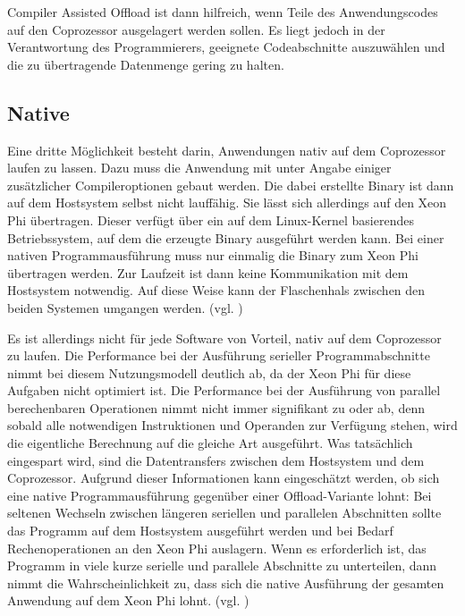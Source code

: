 \documentclass[../main.tex]{subfiles}
\begin{document}
Compiler Assisted Offload ist dann hilfreich, wenn Teile des Anwendungscodes auf den Coprozessor ausgelagert werden sollen. Es liegt jedoch in der Verantwortung des Programmierers, geeignete Codeabschnitte auszuwählen und die zu übertragende Datenmenge gering zu halten. 

\subsection{Native}
Eine dritte Möglichkeit besteht darin, Anwendungen nativ auf dem Coprozessor laufen zu lassen. Dazu muss die Anwendung mit unter Angabe einiger zusätzlicher Compileroptionen gebaut werden. Die dabei erstellte Binary ist dann auf dem Hostsystem selbst nicht lauffähig. Sie lässt sich allerdings auf den Xeon Phi übertragen. Dieser verfügt über ein auf dem Linux-Kernel basierendes Betriebssystem, auf dem die erzeugte Binary ausgeführt werden kann. Bei einer nativen Programmausführung muss nur einmalig die Binary zum Xeon Phi übertragen werden. Zur Laufzeit ist dann keine Kommunikation mit dem Hostsystem notwendig. Auf diese Weise kann der Flaschenhals zwischen den beiden Systemen umgangen werden. (vgl. \cite{xeonphiQuickstart})

Es ist allerdings nicht für jede Software von Vorteil, nativ auf dem Coprozessor zu laufen. Die Performance bei der Ausführung serieller Programmabschnitte nimmt bei diesem Nutzungsmodell deutlich ab, da der Xeon Phi für diese Aufgaben nicht optimiert ist. Die Performance bei der Ausführung von parallel berechenbaren Operationen nimmt nicht immer signifikant zu oder ab, denn sobald alle notwendigen Instruktionen und Operanden zur Verfügung stehen, wird die eigentliche Berechnung auf die gleiche Art ausgeführt. Was tatsächlich eingespart wird, sind die Datentransfers zwischen dem Hostsystem und dem Coprozessor. Aufgrund dieser Informationen kann eingeschätzt werden, ob sich eine native Programmausführung gegenüber einer Offload-Variante lohnt: Bei seltenen Wechseln zwischen längeren seriellen und parallelen Abschnitten sollte das Programm auf dem Hostsystem ausgeführt werden und bei Bedarf Rechenoperationen an den Xeon Phi auslagern. Wenn es erforderlich ist, das Programm in viele kurze serielle und parallele Abschnitte zu unterteilen, dann nimmt die Wahrscheinlichkeit zu, dass sich die native Ausführung der gesamten Anwendung auf dem Xeon Phi lohnt. (vgl. \cite{xeonphiQuickstart})
\end{document}

